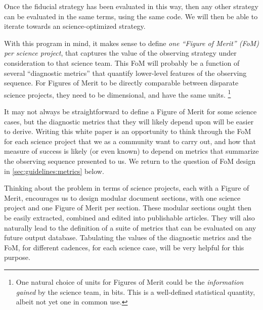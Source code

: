 Once the fiducial strategy has
been evaluated in this way, then any other strategy can be evaluated
in the same terms, using the same code.  We will then be able to iterate towards an
science-optimized strategy.

With this program in mind, it makes sense to define {\it one ``Figure
of Merit'' (FoM) per science project}, that captures the value of  the
observing strategy under consideration to that science team. This FoM
will probably be a function of several ``diagnostic metrics'' that quantify
lower-level features of the observing sequence.  For Figures of Merit
to be directly comparable between disparate science projects,  they
need to be dimensional, and have the same units.
\footnote{One natural choice of units for Figures of Merit could be the
{\it information  gained} by the science team, in bits. This is a
well-defined statistical quantity, albeit not yet one in common use.}

It may not always be straightforward to define a Figure of
Merit for some science cases, but the diagnostic metrics that they will likely depend
upon will be easier to derive. Writing this white paper is an
opportunity to think through the FoM for each science
project that we as a community want to carry out, and how that measure
of success is likely (or even known) to depend on metrics that
summarize the observing sequence presented to us. We return to the
question of FoM design in \autoref{sec:guidelines:metrics} below.

Thinking about the problem in terms of science projects, each with a
Figure of Merit, encourages us to design modular document sections, with
one science project and one Figure of Merit per section. These modular
sections ought then be easily extracted, combined and edited into
publishable articles. They will also naturally lead to the definition of
a suite of \MAF metrics that can be evaluated on any future \OpSim output
database.  Tabulating the values of the diagnostic metrics and the FoM,
for different cadences, for each science case, will be very helpful for
this purpose.

